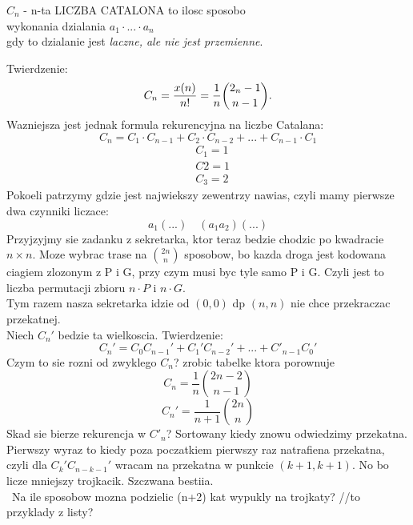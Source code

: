 \documentclass{article}
\begin{document}
\begin{center}\large
    $C_n$ - {\color{def}n-ta LICZBA CATALONA} to ilosc sposobo \\wykonania dzialania $a_1\cdot...\cdot a_n$ \\gdy to dzialanie jest \emph{laczne, ale nie jest przemienne}.
\end{center}\bigskip
{\large\color{emp}Twierdzenie}: 
$$C_n=\frac{x(n)}{n!}=\frac1n{2_n-1\choose n-1}.\bigskip$$
Wazniejsza jest jednak {\color{acc}formula rekurencyjna na liczbe Catalana}:
{\large$$ C_n=C_1\cdot C_{n-1}+C_2\cdot C_{n-2}+...+C_{n-1}\cdot C_1$$}
\begin{align*}
    &C_1=1\\
    &C2=1\\
    &C_3=2
\end{align*}
Pokoeli patrzymy gdzie jest najwiekszy zewentrzy nawias, czyli mamy pierwsze dwa czynniki liczace:
$$a_1(...)\quad (a_1a_2)(...)$$
Przyjzyjmy sie zadanku z sekretarka, ktor teraz bedzie chodzic po kwadracie $n\times n$. Moze wybrac trase na ${2n\choose n}$ sposobow, bo kazda droga jest kodowana ciagiem zlozonym z P i G, przy czym musi byc tyle samo P i G. Czyli jest to liczba permutacji zbioru $n\cdot P$ i $n\cdot G$.\smallskip\\
Tym razem nasza sekretarka idzie od $(0,0)$ dp $(n,n)$ nie chce przekraczac przekatnej. \\
Niech $C_n'$ bedzie ta wielkoscia.
Twierdzenie:
$$C_n'=C_0C_{n-1}'+C_1'C_{n-2}'+...+C'_{n-1}C_0'$$
Czym to sie rozni od zwyklego $C_n$?
zrobic tabelke ktora porownuje
$$C_n=\frac1n{2n-2\choose n-1}$$
$$C_n'=\frac1{n+1}{2n\choose n}$$
\dowod
Skad sie bierze rekurencja w $C'_n$? Sortowany kiedy znowu odwiedzimy przekatna.\\
Pierwszy wyraz to kiedy poza poczatkiem pierwszy raz natrafiena przekatna, czyli dla $C_k'C_{n-k-1}'$  wracam na przekatna w punkcie $(k+1, k+1)$. No bo licze mniejszy trojkacik. Szczwana bestiia.\\\
Na ile sposobow mozna podzielic (n+2) kat wypukly na trojkaty? //to przyklady z listy?
\end{document}
